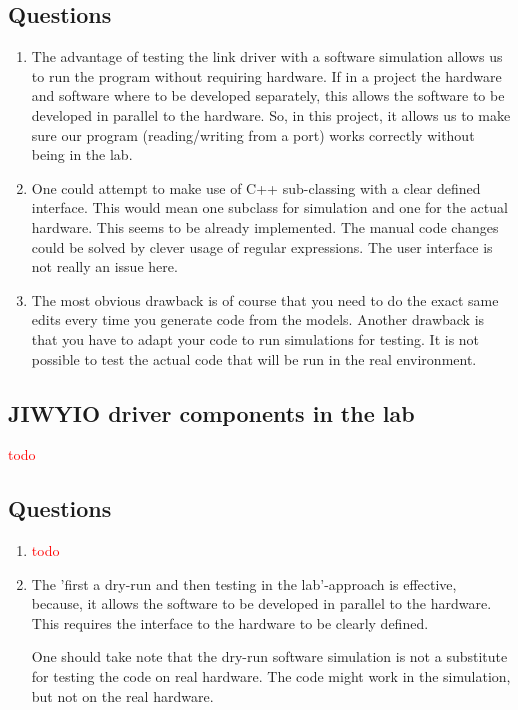 \documentclass[a4paper,twoside,11pt]{article}
\newcommand{\todo}[1]{{\Large\sc\textcolor{red}{#1}}}
\begin{document}
\subsection{Questions}
\begin{enumerate}
	\item The advantage of testing the link driver with a software simulation 
		allows us to run the program without requiring hardware.
		If in a project the hardware and software where to be developed 
		separately, this allows the software to be developed in parallel to the hardware.
		So, in this project, it allows us to make sure our program (reading/writing from a port) works correctly without being in the lab.
	\item One could attempt to make use of C++ sub-classing with a clear defined interface.
		This would mean one subclass for simulation and one for the actual hardware.
		This seems to be already implemented. The manual code changes could be solved by clever usage of regular expressions. The user interface is not really an issue here.
	\item The most obvious drawback is of course that you need to do the exact same edits every time you generate code from the models. Another drawback is that you have to adapt your code to run simulations for testing. It is not possible to test the actual code that will be run in the real environment.
\end{enumerate}

\subsection{JIWYIO driver components in the lab}
\todo{todo}

\subsection{Questions}
\begin{enumerate}
 \item \todo{todo}
 \item The 'first a dry-run and then testing in the lab'-approach is effective, because, it allows the software to be developed in parallel to the hardware.
	 This requires the interface to the hardware to be clearly defined.
	 \smallskip

	 One should take note that the dry-run software simulation is not a 
	 substitute for testing the code on real hardware.
	 The code might work in the simulation, but not on the real hardware.
\end{enumerate}
\end{document}
